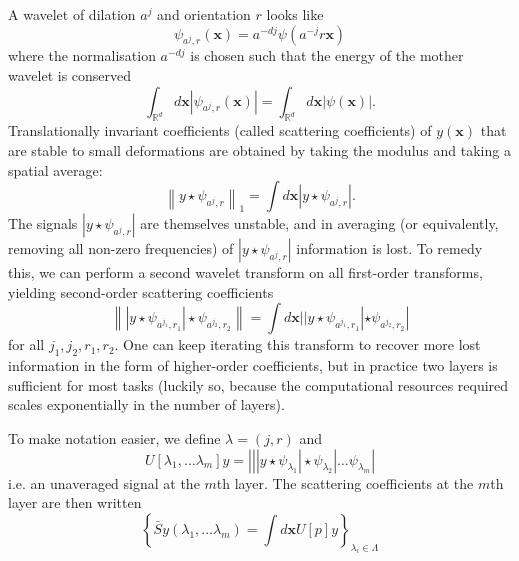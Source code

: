 \documentclass[twocolumn, openany, oneside, article]{memoir}
\begin{document}
A wavelet of dilation $a^j$ and orientation $r$ looks like
\begin{equation}
  \psi_{a^j, r}(\bm{x}) = a^{-dj} \psi(a^{-j}r\bm{x})
\end{equation}
where the normalisation $a^{-dj}$ is chosen such that the energy of the mother wavelet is
conserved
\begin{equation}
  \int_{\mathbb{R}^d} d\bm{x} | \psi_{a^j, r}(\bm{x}) | = \int_{\mathbb{R}^d} d\bm{x} | \psi(\bm{x}) |.
\end{equation}
Translationally invariant coefficients (called scattering coefficients) of $y(\bm{x})$ that are stable to small deformations are obtained by taking the modulus and taking a spatial average:
\begin{equation}
    \left\| y \star \psi_{a^j, r} \right\|_{1} = \int d\bm{x} |y \star \psi_{a^j, r}|.
\end{equation}
The signals $|y \star \psi_{a^j, r}|$ are themselves unstable, and in averaging (or equivalently, removing all non-zero
frequencies) of $|y \star \psi_{a^j, r}|$ information is lost. To remedy this, we can perform a second wavelet
transform on all first-order transforms, yielding second-order scattering coefficients
\begin{equation}
  \left\| |y \star \psi_{a^{j_1}, r_1}| \star \psi_{a^{j_2}, r_2} \right\| = \int d\bm{x} | |y \star \psi_{a^{j_1}, r_1}| \star \psi_{a^{j_2}, r_2} |
\end{equation}
for all $j_1, j_2, r_1, r_2$. One can keep iterating this transform to recover more lost information in the form of
higher-order coefficients, but in practice two layers is sufficient for most tasks (luckily so, because the
computational resources required scales exponentially in the number of layers).

To make notation easier, we define $\lambda = (j, r)$ and
\begin{equation}
  U[\lambda_1, \dots \lambda_m]y = \left| \left| \left| y \star \psi_{\lambda_1} \right| \star \psi_{\lambda_2} \right|
  \dots \psi_{\lambda_m} \right|
\end{equation}
i.e. an unaveraged signal at the $m$th layer. The scattering coefficients
at the $m$th layer are then written
\begin{equation}
  \left\{ \bar{S}y(\lambda_1, \dots \lambda_m) = \int d\bm{x} U[p]y \right\}_{\lambda_i \in \Lambda}
\end{equation}
\end{document}
